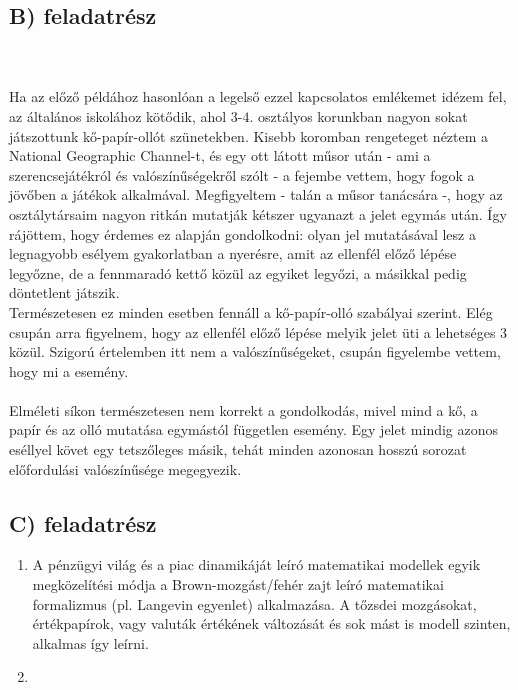 \subsection*{B) feladatrész}
\\ \\
Ha az előző példához hasonlóan a legelső ezzel kapcsolatos emlékemet idézem fel, az általános iskolához kötődik, ahol $3$-$4$. osztályos korunkban nagyon sokat játszottunk kő-papír-ollót szünetekben. Kisebb koromban rengeteget néztem a National Geographic Channel-t, és egy ott látott műsor után - ami a szerencsejátékról és valószínűségekről szólt - a fejembe vettem, hogy  fogok a jövőben a játékok alkalmával. Megfigyeltem - talán a műsor tanácsára -, hogy az osztálytársaim nagyon ritkán mutatják kétszer ugyanazt a jelet egymás után. Így rájöttem, hogy érdemes ez alapján gondolkodni: olyan jel mutatásával lesz a legnagyobb esélyem gyakorlatban a nyerésre, amit az ellenfél előző lépése legyőzne, de a fennmaradó kettő közül az egyiket legyőzi, a másikkal pedig döntetlent játszik. \\
Természetesen ez minden esetben fennáll a kő-papír-olló szabályai szerint. Elég csupán arra figyelnem, hogy az ellenfél előző lépése melyik jelet üti a lehetséges $3$ közül. Szigorú értelemben itt nem  a valószínűségeket, csupán figyelembe vettem, hogy mi a  esemény.
\\ \\
Elméleti síkon természetesen nem korrekt a gondolkodás, mivel mind a kő, a papír és az olló mutatása egymástól független esemény. Egy jelet mindig azonos eséllyel követ egy tetszőleges másik, tehát minden azonosan hosszú sorozat előfordulási valószínűsége megegyezik.

\subsection*{C) feladatrész}

\begin{enumerate}
    \item A pénzügyi világ és a piac dinamikáját leíró matematikai modellek egyik megközelítési módja a Brown-mozgást/fehér zajt leíró matematikai formalizmus (pl. Langevin egyenlet\cite{2013ChPhL..30h8901T}) alkalmazása. A tőzsdei mozgásokat, értékpapírok, vagy valuták értékének változását és sok mást is modell szinten, alkalmas így leírni.
    \item 
\end{enumerate}
